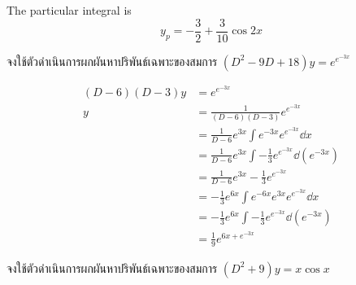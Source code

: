 \documentclass[12pt,final]{novelette} %
\begin{document}
\begin{question}[resume]
    The particular integral is
    $$
        \boxed{y_p = - \frac{3}{2} + \frac{3}{10} \cos 2x}
    $$

    \pagebreak

    \item {}
    จงใช้ตัวดำเนินการผกผันหาปริพันธ์เฉพาะของสมการ $(D^2 - 9D + 18)y = e^{e^{-3x}}$ 

    \vspace*{-1em}
    \begin{align*}
        (D-6)(D-3)y & = e^{e^{-3x}}                                                     \\
        y           & = \frac{1}{(D-6)(D-3)} e^{e^{-3x}}                                \\
                    & = \frac{1}{D-6} e^{3x} \int e^{-3x} e^{e^{-3x}} \dd{x}            \\
                    & = \frac{1}{D-6} e^{3x} \int -\frac{1}{3} e^{e^{-3x}} \dd(e^{-3x}) \\
                    & = \frac{1}{D-6} e^{3x} -\frac{1}{3} e^{e^{-3x}}                   \\
                    & = -\frac13 e^{6x} \int e^{-6x} e^{3x} e^{e^{-3x}} \dd{x}          \\
                    & = -\frac13 e^{6x} \int -\frac{1}{3} e^{e^{-3x}} \dd(e^{-3x})      \\
                    & = \boxed{\frac19 e^{6x+e^{-3x}}}
    \end{align*}

    \item {}
    จงใช้ตัวดำเนินการผกผันหาปริพันธ์เฉพาะของสมการ $(D^2+9)y = x \cos x$ 


\end{question}
\end{document}
